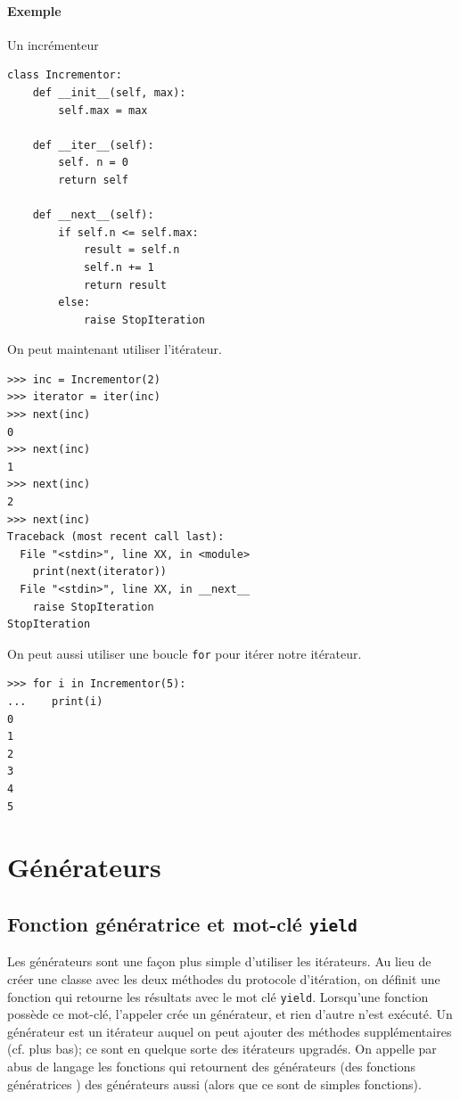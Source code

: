\documentclass[a4paper, 10pt]{article}
\begin{document}
\paragraph{Exemple} Un incrémenteur
\begin{verbatim}
class Incrementor:
    def __init__(self, max):
        self.max = max

    def __iter__(self):
        self. n = 0
        return self

    def __next__(self):
        if self.n <= self.max:
            result = self.n
            self.n += 1
            return result
        else:
            raise StopIteration
\end{verbatim}
On peut maintenant utiliser l'itérateur.
\begin{verbatim}
>>> inc = Incrementor(2)
>>> iterator = iter(inc)
>>> next(inc)
0
>>> next(inc)
1
>>> next(inc)
2
>>> next(inc)
Traceback (most recent call last):
  File "<stdin>", line XX, in <module>
    print(next(iterator))
  File "<stdin>", line XX, in __next__
    raise StopIteration
StopIteration
\end{verbatim}
On peut aussi utiliser une boucle \texttt{for} pour itérer notre itérateur.
\begin{verbatim}
>>> for i in Incrementor(5):
...    print(i)
0
1
2
3
4
5
\end{verbatim}

\section{Générateurs}
\subsection{Fonction génératrice et mot-clé \texttt{yield}}

Les générateurs sont une façon plus simple d'utiliser les itérateurs. Au lieu de créer une classe avec les deux méthodes du protocole d'itération, on définit une fonction qui retourne les résultats avec le mot clé \texttt{yield}. Lorsqu'une fonction possède ce mot-clé, l'appeler crée un générateur, et rien d'autre n'est exécuté. Un générateur est un itérateur auquel on peut ajouter des méthodes supplémentaires (cf. plus bas); ce sont en quelque sorte des itérateurs upgradés. On appelle par abus de langage les fonctions qui retournent des générateurs (des \og fonctions génératrices \fg{}) des générateurs aussi (alors que ce sont de simples fonctions).\bigskip
\end{document}
